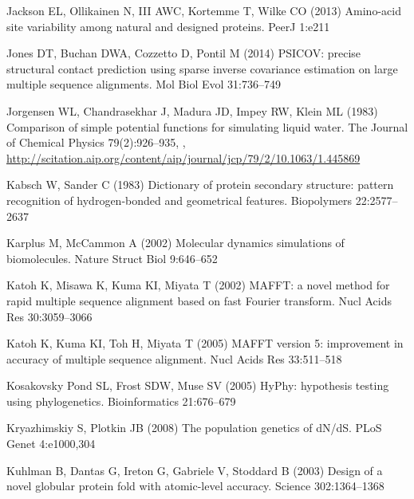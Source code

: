 \documentclass[smallextended]{svjour3}
\begin{document}
\begin{thebibliography}{55}
Jackson EL, Ollikainen N, III AWC, Kortemme T, Wilke CO (2013) Amino-acid site
  variability among natural and designed proteins. PeerJ 1:e211

Jones DT, Buchan DWA, Cozzetto D, Pontil M (2014) {PSICOV:} precise structural
  contact prediction using sparse inverse covariance estimation on large
  multiple sequence alignments. Mol Biol Evol 31:736--749

Jorgensen WL, Chandrasekhar J, Madura JD, Impey RW, Klein ML (1983) Comparison
  of simple potential functions for simulating liquid water. The Journal of
  Chemical Physics 79(2):926--935, ,
  \urlprefix\url{http://scitation.aip.org/content/aip/journal/jcp/79/2/10.1063/1.445869}

Kabsch W, Sander C (1983) Dictionary of protein secondary structure: pattern
  recognition of hydrogen-bonded and geometrical features. Biopolymers
  22:2577--2637

Karplus M, McCammon A (2002) Molecular dynamics simulations of biomolecules.
  Nature Struct Biol 9:646--652

Katoh K, Misawa K, Kuma KI, Miyata T (2002) {MAFFT:} a novel method for rapid
  multiple sequence alignment based on fast {Fourier} transform. Nucl Acids Res
  30:3059--3066

Katoh K, Kuma KI, Toh H, Miyata T (2005) {MAFFT} version 5: improvement in
  accuracy of multiple sequence alignment. Nucl Acids Res 33:511--518

{Kosakovsky Pond} SL, Frost SDW, Muse SV (2005) {HyPhy}: hypothesis testing
  using phylogenetics. Bioinformatics 21:676--679

Kryazhimskiy S, Plotkin JB (2008) The population genetics of {dN/dS}. PLoS
  Genet 4:e1000,304

Kuhlman B, Dantas G, Ireton G, Gabriele V, Stoddard B (2003) Design of a novel
  globular protein fold with atomic-level accuracy. Science 302:1364--1368


\end{thebibliography}
\end{document}
